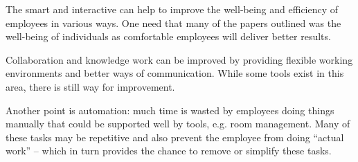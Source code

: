 The smart and interactive can help to improve the well-being and efficiency of employees in various ways. One need that many of the papers outlined was the well-being of individuals as comfortable employees will deliver better results.

Collaboration and knowledge work can be improved by providing flexible working environments and better ways of communication. While some tools exist in this area, there is still way for improvement. 

Another point is automation: much time is wasted by employees doing things manually that could be supported well by tools, e.g. room management. Many of these tasks may be repetitive and also prevent the employee from doing ``actual work'' -- which in turn provides the chance to remove or simplify these tasks.
